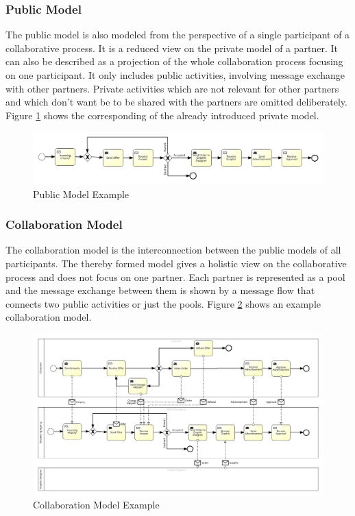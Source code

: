 \documentclass[runningheads]{llncs}
\begin{document}
\subsubsection{Public Model}
The public model is also modeled from the perspective of a single participant of a collaborative process. It is a reduced view on the private model of a partner. It can also be described as a projection of the whole collaboration process focusing on one participant. It only includes public activities, involving message exchange with other partners. Private activities which are not relevant for other partners and which don't want be to be shared with the partners are omitted deliberately. Figure \ref{fig:publicModel} shows the corresponding of the already introduced private model. 

\begin{figure}
\centering
\includegraphics[width=\textwidth]{images/public_process_agency.png}
\caption{Public Model Example}
\label{fig:publicModel}
\end{figure}

\subsubsection{Collaboration Model}
The collaboration model is the interconnection between the public models of all participants. The thereby formed model gives a holistic view on the collaborative process and does not focus on one partner. Each partner is represented as a pool and the message exchange between them is shown by a message flow that connects two public activities or just the pools. Figure \ref{fig:collabModel} shows an example collaboration model.

\begin{figure}
\centering
\includegraphics[width=\textwidth]{images/collab_advertisement.png}
\caption{Collaboration Model Example}
\label{fig:collabModel}
\end{figure}
\end{document}
